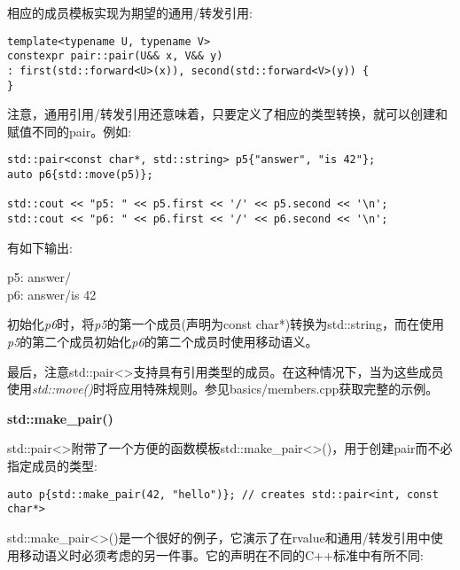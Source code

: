 相应的成员模板实现为期望的通用/转发引用:\par

\begin{lstlisting}[caption={}]
template<typename U, typename V>
constexpr pair::pair(U&& x, V&& y)
: first(std::forward<U>(x)), second(std::forward<V>(y)) {
}
\end{lstlisting}

注意，通用引用/转发引用还意味着，只要定义了相应的类型转换，就可以创建和赋值不同的pair。例如:\par

\begin{lstlisting}[caption={}]
std::pair<const char*, std::string> p5{"answer", "is 42"};
auto p6{std::move(p5)};

std::cout << "p5: " << p5.first << '/' << p5.second << '\n';
std::cout << "p6: " << p6.first << '/' << p6.second << '\n';
\end{lstlisting}

有如下输出:\par

\begin{tcolorbox}[colback=white,colframe=black]
p5: answer/ \\
p6: answer/is 42
\end{tcolorbox}

初始化\textit{p6}时，将\textit{p5}的第一个成员(声明为const char*)转换为std::string，而在使用\textit{p5}的第二个成员初始化\textit{p6}的第二个成员时使用移动语义。\par

最后，注意std::pair<>支持具有引用类型的成员。在这种情况下，当为这些成员使用\textit{std::move()}时将应用特殊规则。参见basics/members.cpp获取完整的示例。\par

\hspace*{\fill} \par %
\textbf{std::make\_pair()}

std::pair<>附带了一个方便的函数模板std::make\_pair<>()，用于创建pair而不必指定成员的类型:\par

\begin{lstlisting}[caption={}]
auto p{std::make_pair(42, "hello")}; // creates std::pair<int, const char*>
\end{lstlisting}

std::make\_pair<>()是一个很好的例子，它演示了在rvalue和通用/转发引用中使用移动语义时必须考虑的另一件事。它的声明在不同的C++标准中有所不同:\par

